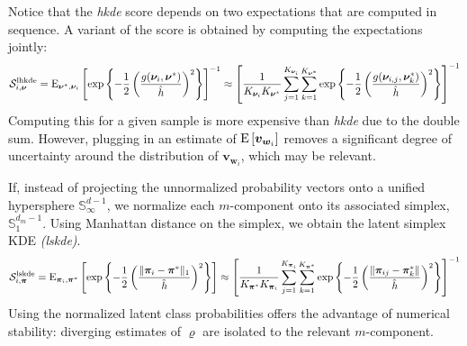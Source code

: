 Notice that the \emph{hkde} score depends on two expectations that are computed
in sequence. A variant of the score is obtained by computing the 
    expectations jointly:
    \begin{equation}
        \label{score:cat_lhkde}
        \mathcal{S}_{i,\bm{\nu}}^{\text{lhkde}} = \text{E}_{\bm{\nu}^*,\bm{\nu}_i}\left[
        \exp\left\lbrace
        -\frac{1}{2}\left(
        \frac{g(\bm{\nu}_i, \bm{\nu}^*)}{\hat{h}}
        \right)^2
        \right\rbrace
        \right]^{-1} \approx \left[\frac{1}{K_{\bm{\nu}_i}K_{\bm{\nu}^*}}
            \sum_{j = 1}^{K_{\bm{\nu}_i}}\sum_{k = 1}^{K_{\bm{\nu}^*}}
            \exp\left\lbrace-\frac{1}{2}
                \left(\frac{g(\bm{\nu}_{i,j},\bm{\nu}_{k}^*)}{\hat{h}}\right)^2
                \right\rbrace\right]^{-1}
    \end{equation}
    Computing this for a given sample is more expensive 
    than \emph{hkde} due to the double sum.  However, plugging in an estimate of
    $\text{E}\left[\bm{v}_{\bm{w}_i}\right]$ removes a significant degree of uncertainty around the 
    distribution of $\bm{v}_{\bm{w}_i}$, which may be relevant.

If, instead of projecting the unnormalized probability vectors onto a unified 
    hypersphere $\mathbb{S}_{\infty}^{d-1}$, we normalize each $m$-component 
    onto its associated simplex, $\mathbb{S}_1^{d_m - 1}$.  Using Manhattan distance on the simplex, we 
    obtain the latent simplex KDE \emph{(lskde)}.
    \begin{equation}
        \label{score:cat_lskde}
        \mathcal{S}_{i,\bm{\pi}}^{\text{lskde}} = \text{E}_{\bm{\pi}_i,\bm{\pi}^*}\left[\exp\left\lbrace
        -\frac{1}{2}\left(
        \frac{\lVert \bm{\pi}_i - \bm{\pi}^*\rVert_1}{\hat{h}}
        \right)^2
        \right\rbrace
        \right]
        \approx \left[
            \frac{1}{K_{\bm{\pi}^*}K_{\bm{\pi}_i}}\sum_{j=1}^{K_{\bm{\pi}_i}}\sum_{k=1}^{K_{\bm{\pi}^*}}\exp\left\lbrace
            -\frac{1}{2}\left(\frac{\lVert \bm{\pi}_{ij} - \bm{\pi}_k^*\rVert}{\hat{h}}\right)^2
            \right\rbrace
        \right]^{-1}
    \end{equation}
    Using the normalized latent class probabilities offers the advantage of
    numerical stability: diverging estimates of $\varrho$ are isolated to the
    relevant $m$-component.

